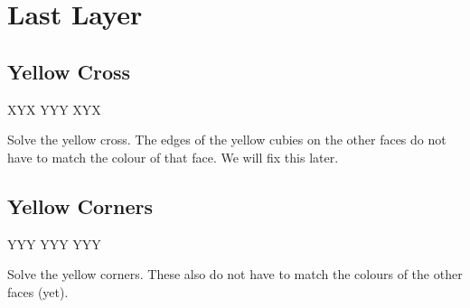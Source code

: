 \section{Last Layer}

\subsection{Yellow Cross}

\RubikCubeGreyAll
\RubikFaceUp XYX YYY XYX

\begin{goal}[\DrawRubikFaceUp]
    Solve the yellow cross.
    The edges of the yellow cubies on the other faces do not have to match the colour of that face.
    We will fix this later.
\end{goal}

\subsection{Yellow Corners}
\RubikCubeGreyAll
\RubikFaceUp YYY YYY YYY

\begin{goal}[\DrawRubikFaceUp]
    Solve the yellow corners.
    These also do not have to match the colours of the other faces (yet).
\end{goal}